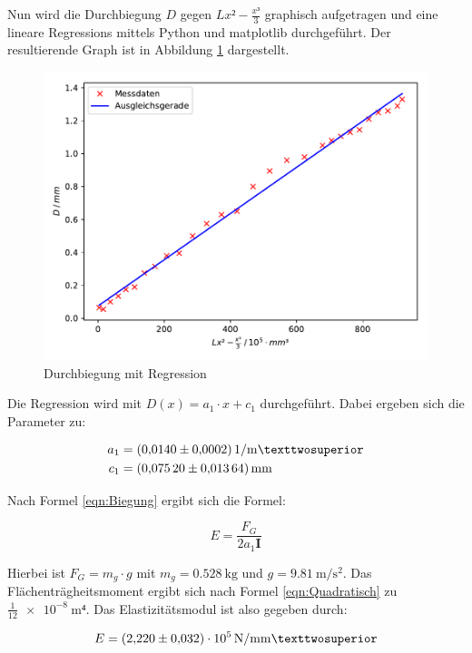 Nun wird die Durchbiegung $D$ gegen $Lx²-\frac{x³}{3}$ graphisch aufgetragen
und eine lineare Regressions mittels Python und matplotlib durchgeführt.
Der resultierende Graph ist in Abbildung \ref{fig:plot1} dargestellt.

\begin{figure}
  \centering
  \includegraphics[scale=0.8]{content/plot1.pdf}
  \caption{Durchbiegung mit Regression}
  \label{fig:plot1}
\end{figure}

Die Regression wird mit $D(x) = a_1\cdot x + c_1$ durchgeführt. Dabei ergeben 
sich die Parameter zu: 

\begin{align*}
a_1 &= \SI{0.0140+-0.0002}{1\per\meter²}\\
c_1 &= \SI{0.0752+-0.01364}{\milli\meter}
\end{align*}

Nach Formel \eqref{eqn:Biegung} ergibt sich die Formel: 

\begin{equation*}
E = \frac{F_G}{2a_1\symbf{I}}
\end{equation*}

Hierbei ist $F_G = m_g\cdot g$ mit $m_g = \SI{0.528}{\kilo\gram}$ und 
$g = \SI{9.81}{\meter\per\second\squared}$. Das Flächenträgheitsmoment
ergibt sich nach Formel \eqref{eqn:Quadratisch} zu $\frac{1}{12}\SI{e-8}{\meter⁴}$. 
Das Elastizitätsmodul ist also gegeben durch: 

\begin{equation*}
E = \SI{2.220+-0.032e5}{\newton\per\milli\meter²}
\end{equation*}


